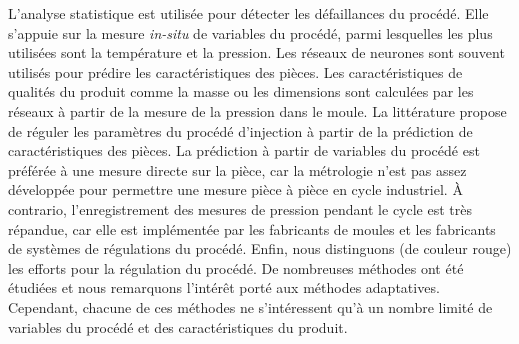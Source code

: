 L'analyse statistique est utilisée pour détecter les défaillances du procédé.
Elle s’appuie sur la mesure \textit{in-situ} de variables du procédé, parmi lesquelles les plus utilisées sont la température et la pression.
Les réseaux de neurones sont souvent utilisés pour prédire les caractéristiques des pièces.
Les caractéristiques de qualités du produit comme la masse ou les dimensions sont calculées par les réseaux à partir de la mesure de la pression dans le moule.
La littérature propose de réguler les paramètres du procédé d’injection à partir de la prédiction de caractéristiques des pièces.
La prédiction à partir de variables du procédé est préférée à une mesure directe sur la pièce, car la métrologie n’est pas assez développée pour permettre une mesure pièce à pièce en cycle industriel.
À contrario, l'enregistrement des mesures de pression pendant le cycle est très répandue, car elle est implémentée par les fabricants de moules et les fabricants de systèmes de régulations du procédé.
Enfin, nous distinguons (de couleur rouge) les efforts pour la régulation du procédé.
De nombreuses méthodes ont été étudiées et nous remarquons l’intérêt porté aux méthodes adaptatives.
Cependant, chacune de ces méthodes ne s’intéressent qu’à un nombre limité de variables du procédé et des caractéristiques du produit.

